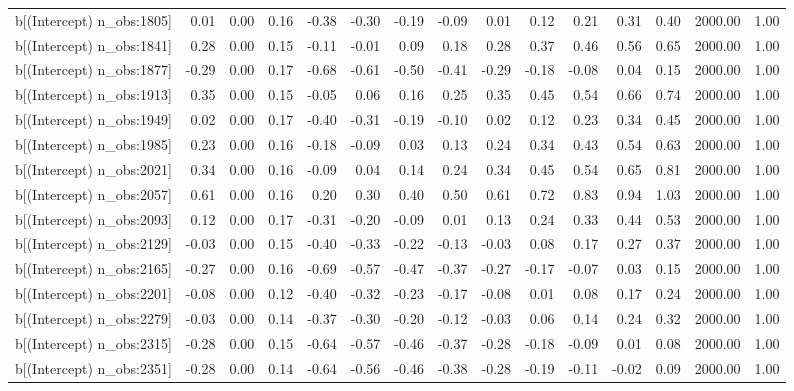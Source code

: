 \begin{table}[ht]
\begin{tabular}{rrrrrrrrrrrrrrr}
  b[(Intercept) n\_obs:1805] & 0.01 & 0.00 & 0.16 & -0.38 & -0.30 & -0.19 & -0.09 & 0.01 & 0.12 & 0.21 & 0.31 & 0.40 & 2000.00 & 1.00 \\ 
  b[(Intercept) n\_obs:1841] & 0.28 & 0.00 & 0.15 & -0.11 & -0.01 & 0.09 & 0.18 & 0.28 & 0.37 & 0.46 & 0.56 & 0.65 & 2000.00 & 1.00 \\ 
  b[(Intercept) n\_obs:1877] & -0.29 & 0.00 & 0.17 & -0.68 & -0.61 & -0.50 & -0.41 & -0.29 & -0.18 & -0.08 & 0.04 & 0.15 & 2000.00 & 1.00 \\ 
  b[(Intercept) n\_obs:1913] & 0.35 & 0.00 & 0.15 & -0.05 & 0.06 & 0.16 & 0.25 & 0.35 & 0.45 & 0.54 & 0.66 & 0.74 & 2000.00 & 1.00 \\ 
  b[(Intercept) n\_obs:1949] & 0.02 & 0.00 & 0.17 & -0.40 & -0.31 & -0.19 & -0.10 & 0.02 & 0.12 & 0.23 & 0.34 & 0.45 & 2000.00 & 1.00 \\ 
  b[(Intercept) n\_obs:1985] & 0.23 & 0.00 & 0.16 & -0.18 & -0.09 & 0.03 & 0.13 & 0.24 & 0.34 & 0.43 & 0.54 & 0.63 & 2000.00 & 1.00 \\ 
  b[(Intercept) n\_obs:2021] & 0.34 & 0.00 & 0.16 & -0.09 & 0.04 & 0.14 & 0.24 & 0.34 & 0.45 & 0.54 & 0.65 & 0.81 & 2000.00 & 1.00 \\ 
  b[(Intercept) n\_obs:2057] & 0.61 & 0.00 & 0.16 & 0.20 & 0.30 & 0.40 & 0.50 & 0.61 & 0.72 & 0.83 & 0.94 & 1.03 & 2000.00 & 1.00 \\ 
  b[(Intercept) n\_obs:2093] & 0.12 & 0.00 & 0.17 & -0.31 & -0.20 & -0.09 & 0.01 & 0.13 & 0.24 & 0.33 & 0.44 & 0.53 & 2000.00 & 1.00 \\ 
  b[(Intercept) n\_obs:2129] & -0.03 & 0.00 & 0.15 & -0.40 & -0.33 & -0.22 & -0.13 & -0.03 & 0.08 & 0.17 & 0.27 & 0.37 & 2000.00 & 1.00 \\ 
  b[(Intercept) n\_obs:2165] & -0.27 & 0.00 & 0.16 & -0.69 & -0.57 & -0.47 & -0.37 & -0.27 & -0.17 & -0.07 & 0.03 & 0.15 & 2000.00 & 1.00 \\ 
  b[(Intercept) n\_obs:2201] & -0.08 & 0.00 & 0.12 & -0.40 & -0.32 & -0.23 & -0.17 & -0.08 & 0.01 & 0.08 & 0.17 & 0.24 & 2000.00 & 1.00 \\ 
  b[(Intercept) n\_obs:2279] & -0.03 & 0.00 & 0.14 & -0.37 & -0.30 & -0.20 & -0.12 & -0.03 & 0.06 & 0.14 & 0.24 & 0.32 & 2000.00 & 1.00 \\ 
  b[(Intercept) n\_obs:2315] & -0.28 & 0.00 & 0.15 & -0.64 & -0.57 & -0.46 & -0.37 & -0.28 & -0.18 & -0.09 & 0.01 & 0.08 & 2000.00 & 1.00 \\ 
  b[(Intercept) n\_obs:2351] & -0.28 & 0.00 & 0.14 & -0.64 & -0.56 & -0.46 & -0.38 & -0.28 & -0.19 & -0.11 & -0.02 & 0.09 & 2000.00 & 1.00 \\ 

\end{tabular}
\end{table}
